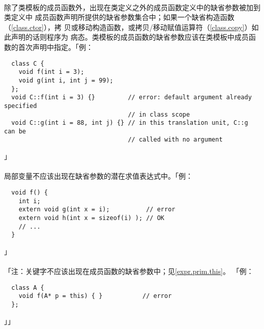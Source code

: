 \paragraph{}
除了类模板的成员函数外，出现在类定义之外的成员函数定义中的缺省参数被加到类定义中
成员函数声明所提供的缺省参数集合中；如果一个缺省构造函数（\ref{class.ctor}），拷
贝或移动构造函数，或拷贝/移动赋值运算符（\ref{class.copy}）如此声明的话则程序为
病态。类模板的成员函数的缺省参数应该在类模板中成员函数的首次声明中指定。「例：
\begin{lstlisting}
  class C {
    void f(int i = 3);
    void g(int i, int j = 99);
  };
  void C::f(int i = 3) {}         // error: default argument already specified
                                  // in class scope
  void C::g(int i = 88, int j) {} // in this translation unit, C::g can be
                                  // called with no argument
\end{lstlisting}」

\paragraph{}
局部变量不应该出现在缺省参数的潜在求值表达式中。「例：
\begin{lstlisting}
  void f() {
    int i;
    extern void g(int x = i);          // error
    extern void h(int x = sizeof(i) ); // OK
    // ...
  }
\end{lstlisting}」

\paragraph{}
「注：关键字不应该出现在成员函数的缺省参数中；见\ref{expr.prim.this}。
「例：
\begin{lstlisting}
  class A {
    void f(A* p = this) { }           // error
  };
\end{lstlisting}」」

